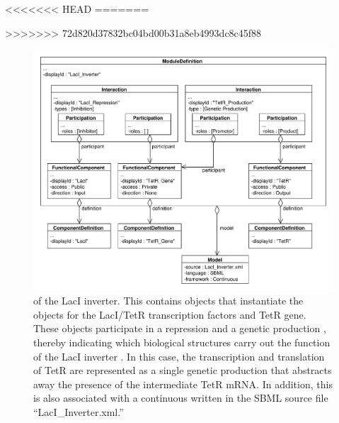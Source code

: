 <<<<<<< HEAD
=======

>>>>>>> 72d820d37832bc04bd00b31a8eb4993dc8c45f88
\begin{figure}[ht]
\begin{center}
\includegraphics[width=\textwidth]{example_uml/toggle_3}
\caption[]{ of the LacI inverter. This  contains  objects that instantiate the  objects for the LacI/TetR transcription factors and TetR gene. These  objects participate in a repression  and a genetic production , thereby indicating which biological structures carry out the function of the LacI inverter . In this case, the transcription and translation of TetR are represented as a single genetic production  that abstracts away the presence of the intermediate TetR mRNA.  In addition, this  is also associated with a continuous  written in the SBML source file ``LacI\_Inverter.xml.''}
\label{uml:ex_mod_def}
\end{center}
\end{figure}


